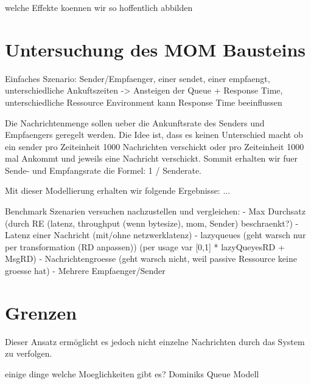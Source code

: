welche Effekte koennen wir so hoffentlich abbilden

\section{Untersuchung des MOM Bausteins}
Einfaches Szenario: Sender/Empfaenger, einer sendet, einer empfaengt, unterschiedliche Ankuftszeiten -> Ansteigen der Queue + Response Time, unterschiedliche Ressource Environment kann Response Time beeinflussen

Die Nachrichtenmenge sollen ueber die Ankunftsrate des Senders und Empfaengers geregelt werden. Die Idee ist, dass es keinen Unterschied macht ob ein sender pro Zeiteinheit 1000 Nachrichten verschickt oder pro Zeiteinheit 1000 mal Ankommt und jeweils eine Nachricht verschickt. Sommit erhalten wir fuer Sende- und Empfangsrate die Formel: 1 / Senderate.

Mit dieser Modellierung erhalten wir folgende Ergebnisse: ...

Benchmark Szenarien versuchen nachzustellen und vergleichen:
- Max Durchsatz (durch RE (latenz, throughput (wenn bytesize), mom, Sender) beschraenkt?)
- Latenz einer Nachricht (mit/ohne netzwerklatenz)
- lazyqueues (geht warsch nur per transformation (RD anpassen)) (per usage var [0,1] * lazyQueyesRD + MsgRD)
- Nachrichtengroesse (geht warsch nicht, weil passive Ressource keine groesse hat)
- Mehrere Empfaenger/Sender 

\section{Grenzen}
Dieser Ansatz ermöglicht es jedoch nicht einzelne Nachrichten durch das System zu verfolgen.

einige dinge 
welche Moeglichkeiten gibt es? Dominiks Queue Modell





